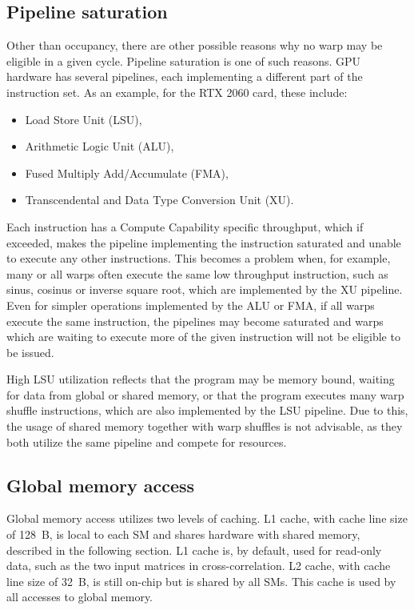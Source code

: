 \subsection{Pipeline saturation}
\label{sec:cuda_pipelines}

Other than occupancy, there are other possible reasons why no warp may be eligible in a given cycle. Pipeline saturation is one of such reasons. GPU hardware has several pipelines, each implementing a different part of the instruction set. As an example, for the RTX 2060 card, these include:
\begin{itemize}
	\item Load Store Unit (LSU),
	\item Arithmetic Logic Unit (ALU),
	\item Fused Multiply Add/Accumulate (FMA),
	\item Transcendental and Data Type Conversion Unit (XU).
\end{itemize}

Each instruction has a Compute Capability specific throughput, which if exceeded, makes the pipeline implementing the instruction saturated and unable to execute any other instructions. This becomes a problem when, for example, many or all warps often execute the same low throughput instruction, such as sinus, cosinus or inverse square root, which are implemented by the XU pipeline. Even for simpler operations implemented by the ALU or FMA, if all warps execute the same instruction, the pipelines may become saturated and warps which are waiting to execute more of the given instruction will not be eligible to be issued.

High LSU utilization reflects that the program may be memory bound, waiting for data from global or shared memory, or that the program executes many warp shuffle instructions, which are also implemented by the LSU pipeline. Due to this, the usage of shared memory together with warp shuffles is not advisable, as they both utilize the same pipeline and compete for resources.


\subsection{Global memory access}

Global memory access utilizes two levels of caching. L1 cache, with cache line size of 128~B, is local to each SM and shares hardware with shared memory, described in the following section. L1 cache is, by default, used for read-only data, such as the two input matrices in cross-correlation. 
L2 cache, with cache line size of 32~B, is still on-chip but is shared by all SMs. This cache is used by all accesses to global memory.

